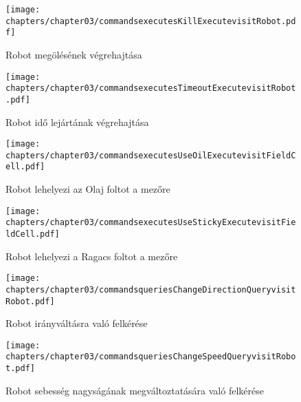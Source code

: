 \begin{figure}[h]
	\begin{center}
		\texttt{[image: chapters/chapter03/commandsexecutesKillExecutevisitRobot.pdf]}
		\caption{Robot megölésének végrehajtása}
		\label{fig:command.executes.KillExecute.visit}
	\end{center}
\end{figure}

\begin{figure}[h]
	\begin{center}
		\texttt{[image: chapters/chapter03/commandsexecutesTimeoutExecutevisitRobot.pdf]}
		\caption{Robot idő lejártának végrehajtása}
		\label{fig:command.executes.TimeoutExecute.visit}
	\end{center}
\end{figure}

\begin{figure}[h]
	\begin{center}
		\texttt{[image: chapters/chapter03/commandsexecutesUseOilExecutevisitFieldCell.pdf]}
		\caption{Robot lehelyezi az Olaj foltot a mezőre}
		\label{fig:command.executes.UseOilExecute.visit}
	\end{center}
\end{figure}

\begin{figure}[h]
	\begin{center}
		\texttt{[image: chapters/chapter03/commandsexecutesUseStickyExecutevisitFieldCell.pdf]}
		\caption{Robot lehelyezi a Ragacs foltot a mezőre}
		\label{fig:command.executes.UseStickyExecute.visit}
	\end{center}
\end{figure}

\begin{figure}[h]
	\begin{center}
		\texttt{[image: chapters/chapter03/commandsqueriesChangeDirectionQueryvisitRobot.pdf]}
		\caption{Robot irányváltásra való felkérése}
		\label{fig:command.executes.ChangeDirectionQuery.visit}
	\end{center}
\end{figure}

\begin{figure}[h]
	\begin{center}
		\texttt{[image: chapters/chapter03/commandsqueriesChangeSpeedQueryvisitRobot.pdf]}
		\caption{Robot sebesség nagyságának megváltoztatására való felkérése}
		\label{fig:command.executes.ChangeSpeedQuery.visit}
	\end{center}
\end{figure}

